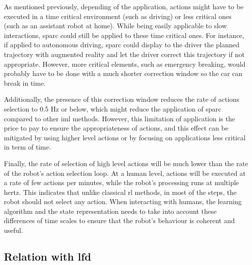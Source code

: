 As mentioned previously, depending of the application, actions might have to be executed in a time critical environment (such as driving) or less critical ones (such as an assistant robot at home). While being easily applicable to slow interactions, \gls{sparc} could still be applied to these time critical ones. For instance, if applied to autonomous driving, \gls{sparc} could display to the driver the planned trajectory with augmented reality and let the driver correct this trajectory if not appropriate. However, more critical elements, such as emergency breaking, would probably have to be done with a much shorter correction window so the car can break in time. 

Additionally, the presence of this correction window reduces the rate of actions selection to 0.5 Hz or below, which might reduce the application of \gls{sparc} compared to other \gls{iml} methods. However, this limitation of application is the price to pay to ensure the appropriateness of actions, and this effect can be mitigated by using higher level actions or by focusing on applications less critical in term of time. 

Finally, the rate of selection of high level actions will be much lower than the rate of the robot's action selection loop. At a human level, actions will be executed at a rate of few actions per minutes, while the robot's processing runs at multiple hertz. This indicates that unlike classical \gls{rl} methods, in most of the steps, the robot should not select any action. When interacting with humans, the learning algorithm and the state representation needs to take into account these differences of time scales to ensure that the robot's behaviour is coherent and useful.

\subsection{Relation with \gls{lfd}}

